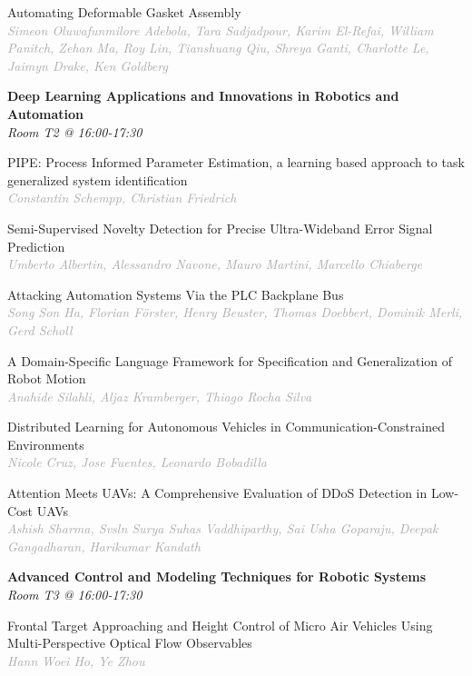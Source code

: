 \begin{multicols*}{2}
\small Automating Deformable Gasket Assembly\\ 
\footnotesize \textcolor{darkgray}{\textit{Simeon Oluwafunmilore Adebola, Tara  Sadjadpour, Karim  El-Refai, William  Panitch, Zehan  Ma, Roy  Lin, Tianshuang  Qiu, Shreya  Ganti, Charlotte  Le, Jaimyn  Drake, Ken  Goldberg}}

\normalsize \textbf{Deep Learning Applications and Innovations in Robotics and Automation}\\
\small \textit{Room T2 @ 16:00-17:30}

\small PIPE: Process Informed Parameter Estimation, a learning based approach to task generalized system identification\\ 
\footnotesize \textcolor{darkgray}{\textit{Constantin Schempp, Christian  Friedrich}}

\small Semi-Supervised Novelty Detection for Precise Ultra-Wideband Error Signal Prediction\\ 
\footnotesize \textcolor{darkgray}{\textit{Umberto Albertin, Alessandro  Navone, Mauro  Martini, Marcello  Chiaberge}}

\small Attacking Automation Systems Via the PLC Backplane Bus\\ 
\footnotesize \textcolor{darkgray}{\textit{Song Son Ha, Florian  Förster, Henry  Beuster, Thomas  Doebbert, Dominik  Merli, Gerd  Scholl}}

\small A Domain-Specific Language Framework for Specification and Generalization of Robot Motion\\ 
\footnotesize \textcolor{darkgray}{\textit{Anahide Silahli, Aljaz  Kramberger, Thiago  Rocha Silva}}

\small Distributed Learning for Autonomous Vehicles in Communication-Constrained Environments\\ 
\footnotesize \textcolor{darkgray}{\textit{Nicole Cruz, Jose  Fuentes, Leonardo  Bobadilla}}

\small Attention Meets UAVs: A Comprehensive Evaluation of DDoS Detection in Low-Cost UAVs\\ 
\footnotesize \textcolor{darkgray}{\textit{Ashish Sharma, Svsln Surya Suhas  Vaddhiparthy, Sai Usha  Goparaju, Deepak  Gangadharan, Harikumar  Kandath}}

\normalsize \textbf{Advanced Control and Modeling Techniques for Robotic Systems}\\
\small \textit{Room T3 @ 16:00-17:30}

\small Frontal Target Approaching and Height Control of Micro Air Vehicles Using Multi-Perspective Optical Flow Observables\\ 
\footnotesize \textcolor{darkgray}{\textit{Hann Woei Ho, Ye  Zhou}}


\end{multicols*}
